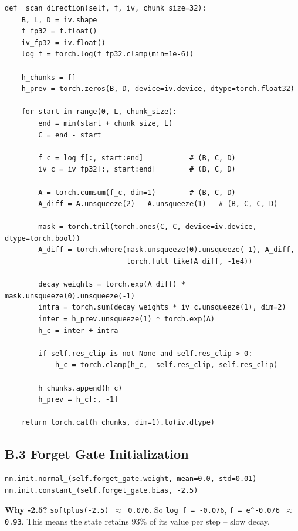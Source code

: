 \begin{lstlisting}
def _scan_direction(self, f, iv, chunk_size=32):
    B, L, D = iv.shape
    f_fp32 = f.float()
    iv_fp32 = iv.float()
    log_f = torch.log(f_fp32.clamp(min=1e-6))
    
    h_chunks = []
    h_prev = torch.zeros(B, D, device=iv.device, dtype=torch.float32)
    
    for start in range(0, L, chunk_size):
        end = min(start + chunk_size, L)
        C = end - start
        
        f_c = log_f[:, start:end]           # (B, C, D)
        iv_c = iv_fp32[:, start:end]        # (B, C, D)
        
        A = torch.cumsum(f_c, dim=1)        # (B, C, D)
        A_diff = A.unsqueeze(2) - A.unsqueeze(1)   # (B, C, C, D)
        
        mask = torch.tril(torch.ones(C, C, device=iv.device, dtype=torch.bool))
        A_diff = torch.where(mask.unsqueeze(0).unsqueeze(-1), A_diff, 
                             torch.full_like(A_diff, -1e4))
        
        decay_weights = torch.exp(A_diff) * mask.unsqueeze(0).unsqueeze(-1)
        intra = torch.sum(decay_weights * iv_c.unsqueeze(1), dim=2)
        inter = h_prev.unsqueeze(1) * torch.exp(A)
        h_c = inter + intra
        
        if self.res_clip is not None and self.res_clip > 0:
            h_c = torch.clamp(h_c, -self.res_clip, self.res_clip)
        
        h_chunks.append(h_c)
        h_prev = h_c[:, -1]
    
    return torch.cat(h_chunks, dim=1).to(iv.dtype)
\end{lstlisting}

\subsection{B.3 Forget Gate Initialization}

\begin{lstlisting}
nn.init.normal_(self.forget_gate.weight, mean=0.0, std=0.01)
nn.init.constant_(self.forget_gate.bias, -2.5)
\end{lstlisting}

\textbf{Why -2.5?} \texttt{softplus(-2.5) $\approx$ 0.076}. So \texttt{log f = -0.076}, 
\texttt{f = e\^{}{-0.076} $\approx$ 0.93}. This means the state retains 93\% of its value 
per step -- slow decay.

